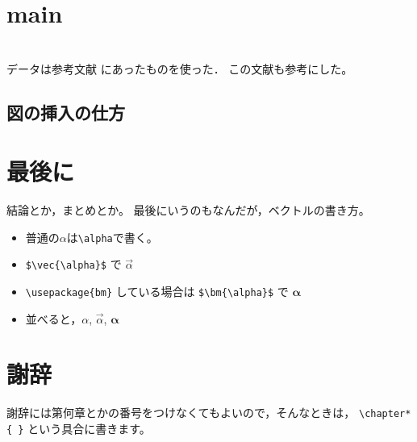 \documentclass[a4paper,12pt]{jsreport}
\theoremstyle{definition}
\begin{document}
\chapter{main}









\chapter{}
データは参考文献\cite{rika} にあったものを使った．
この文献\cite{ten}も参考にした。

\section{図の挿入の仕方}


\chapter{最後に}

結論とか，まとめとか。
最後にいうのもなんだが，ベクトルの書き方。
\begin{itemize}
  \item 普通の$\alpha$は\verb|\alpha|で書く。
  \item \verb|$\vec{\alpha}$| で $\vec{\alpha}$
  \item \verb|\usepackage{bm}| している場合は
        \verb|$\bm{\alpha}$| で $\bm{\alpha}$
  \item 並べると，$\alpha$, $\vec{\alpha}$, $\bm{\alpha}$
\end{itemize}


\chapter*{謝辞}

謝辞には第何章とかの番号をつけなくてもよいので，そんなときは，
\verb|\chapter*{ }| という具合に書きます。
\end{document}
